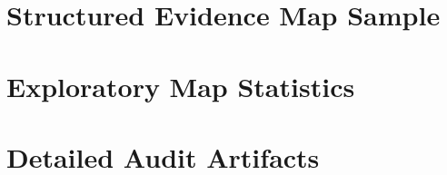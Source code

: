\documentclass[11pt]{article}
\begin{document}
\section{Structured Evidence Map Sample}
\label{sec:lit-map}


\section{Exploratory Map Statistics}
\label{sec:map-statistics}





\section{Detailed Audit Artifacts}
\label{sec:audit-artifacts}













\end{document}
